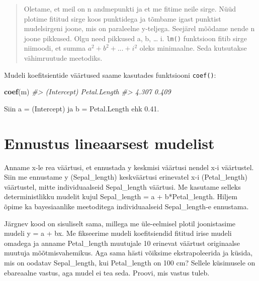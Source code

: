 \documentclass[]{book}
\newenvironment{Shaded}{\begin{snugshade}}{\end{snugshade}}
\newcommand{\CommentTok}[1]{\textcolor[rgb]{0.56,0.35,0.01}{\textit{#1}}}
\newcommand{\KeywordTok}[1]{\textcolor[rgb]{0.13,0.29,0.53}{\textbf{#1}}}
\newcommand{\NormalTok}[1]{#1}
\begin{document}
\begin{quote}
Oletame, et meil on n andmepunkti ja et me fitime neile sirge. Nüüd plotime fititud sirge koos punktidega ja tõmbame igast punktist mudelsirgeni joone, mis on paraleelne y-teljega. Seejärel mõõdame nende n joone pikkused. Olgu need pikkused a, b, \ldots{} i. \texttt{lm()} funktsioon fitib sirge niimoodi, et summa \(a^2 + b^2 + ... + i^2\) oleks minimaalne. Seda kutsutakse vähimruutude meetodiks.
\end{quote}

Mudeli koefitsientide väärtused saame kasutades funktsiooni \texttt{coef()}:

\begin{Shaded}
\begin{Highlighting}[]
\KeywordTok{coef}\NormalTok{(m)}
\CommentTok{#>  (Intercept) Petal.Length }
\CommentTok{#>        4.307        0.409}
\end{Highlighting}
\end{Shaded}

Siin a = (Intercept) ja b = Petal.Length ehk 0.41.

\hypertarget{ennustus-lineaarsest-mudelist}{%
\section{Ennustus lineaarsest mudelist}\label{ennustus-lineaarsest-mudelist}}

Anname x-le rea väärtusi, et ennustada y keskmisi väärtusi nendel x-i väärtustel.
Siin me ennustame y (Sepal\_length) keskväärtusi erinevatel x-i (Petal\_length) väärtustel, mitte individuaalseid Sepal\_length väärtusi. Me kasutame selleks deterministlikku mudelit kujul Sepal\_length = a + b*Petal\_length. Hiljem õpime ka bayesiaanlike meetoditega individuaalseid Sepal\_length-e ennustama.

Järgnev kood on sisuliselt sama, millega me üle-eelmisel plotil joonistasime mudeli y = a + bx.
Me fikseerime mudeli koefitsiendid fititud irise mudeli omadega ja anname Petal\_length muutujale 10 erinevat väärtust originaalse muutuja mõõtmisvahemikus.
Aga sama hästi võiksime ekstrapoleerida ja küsida, mis on oodatav Sepal\_length, kui Petal\_length on 100 cm?
Sellele küsimusele on ebareaalne vastus, aga mudel ei tea seda.
Proovi, mis vastus tuleb.
\end{document}

